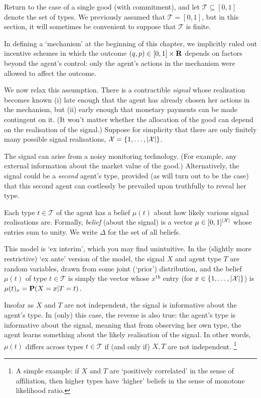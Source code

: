 Return to the case of a single good (with commitment),
and let $\mathcal{T} \subseteq [0,1]$ denote the set of types.
We previously assumed that $\mathcal{T} = [0,1]$,
but in this section, it will sometimes be convenient to suppose that $\mathcal{T}$ is finite.

In defining a `mechanism' at the beginning of this chapter, we implicitly ruled out incentive schemes in which the outcome $(q,p) \in [0,1] \times \mathbf{R}$ depends on factors beyond the agent's control: only the agent's actions in the mechanism were allowed to affect the outcome.

We now relax this assumption. There is a contractible \emph{signal}
whose realisation becomes known
(i) late enough that the agent has already chosen her actions in the mechanism, but
(ii) early enough that monetary payments can be made contingent on it.
(It won't matter whether the allocation of the good can depend on the realisation of the signal.)
Suppose for simplicity that there are only finitely many possible signal realisations, $\mathcal{X}=\{1,\dots,\abs*{\mathcal{X}}\}$.

The signal can arise from a noisy monitoring technology.
(For example, any external information about the market value of the good.)
Alternatively, the signal could be a \emph{second} agent's type,
provided (as will turn out to be the case) that this second agent can costlessly be prevailed upon truthfully to reveal her type.

Each type $t \in \mathcal{T}$ of the agent has a belief $\mu(t)$ about how likely various signal realisations are.
Formally, \emph{belief} (about the signal) is a vector $\mu \in [0,1]^{\abs*{\mathcal{X}}}$ whose entries sum to unity. We write $\Delta$ for the set of all beliefs.

\begin{remark}
	\label{remark:signal_exante}
	This model is `ex interim', which you may find unintuitive.
	In the (slightly more restrictive) `ex ante' version of the model,
	the signal $X$ and agent type $T$ are random variables, drawn from some joint (`prior') distribution,
	and the belief $\mu(t)$ of type $t \in \mathcal{T}$
	is simply the vector whose $x^\text{th}$ entry (for $x \in \{1,\dots,\abs*{\mathcal{X}}\}$) is $\mu(t)_x = \mathbf{P}( X=x | T=t )$.

	Insofar as $X$ and $T$ are not independent, the signal is informative about the agent's type.
	In (only) this case, the reverse is also true:
	the agent's type is informative about the signal, meaning that from observing her own type, the agent learns something about the likely realisation of the signal.
	In other words, $\mu(t)$ differs across types $t \in \mathcal{T}$
	if (and only if) $X,T$ are not independent.%
		\footnote{A simple example: if $X$ and $T$ are `positively correlated' in the sense of affiliation, then higher types have `higher' beliefs in the sense of monotone likelihood ratio.}
\end{remark}


